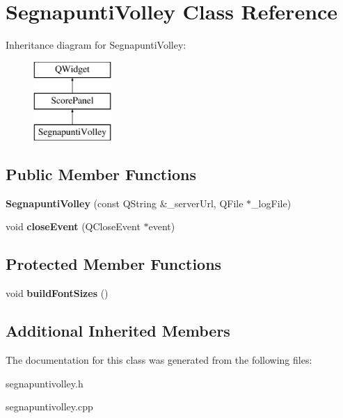 \hypertarget{classSegnapuntiVolley}{}\section{Segnapunti\+Volley Class Reference}
\label{classSegnapuntiVolley}
Inheritance diagram for Segnapunti\+Volley\+:\begin{figure}[H]
\begin{center}
\leavevmode
\includegraphics[height=3.000000cm]{df/d83/classSegnapuntiVolley}
\end{center}
\end{figure}
\subsection*{Public Member Functions}
\begin{DoxyCompactItemize}
\item 
\mbox{\label{classSegnapuntiVolley_a69561b0a121558859b9a7754325e4fb0}} 
{\bfseries Segnapunti\+Volley} (const Q\+String \&\+\_\+server\+Url, Q\+File $\ast$\+\_\+log\+File)
\item 
\mbox{\label{classSegnapuntiVolley_ae73348572db084086209753f299615fd}} 
void {\bfseries close\+Event} (Q\+Close\+Event $\ast$event)
\end{DoxyCompactItemize}
\subsection*{Protected Member Functions}
\begin{DoxyCompactItemize}
\item 
\mbox{\label{classSegnapuntiVolley_acd0da2cc6a4b353930a14762340fbc45}} 
void {\bfseries build\+Font\+Sizes} ()
\end{DoxyCompactItemize}
\subsection*{Additional Inherited Members}


The documentation for this class was generated from the following files\+:\begin{DoxyCompactItemize}
\item 
segnapuntivolley.\+h\item 
segnapuntivolley.\+cpp\end{DoxyCompactItemize}

